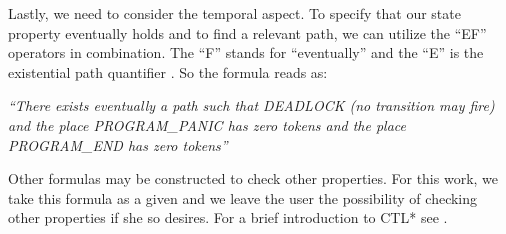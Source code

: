 Lastly, we need to consider the temporal aspect.
To specify that our state property eventually holds and to find a relevant path,
we can utilize the ``EF'' operators in combination.
The ``F'' stands for ``eventually''
and the ``E'' is the existential path quantifier \cite{meyer2020}.
So the formula reads as:

\emph{``There exists eventually a path such that DEADLOCK (no transition may fire)
  and the place PROGRAM\_PANIC has zero tokens and the place PROGRAM\_END has zero tokens''}

Other formulas may be constructed to check other properties.
For this work, we take this formula as a given and
we leave the user the possibility of checking other properties if she so desires.
For a brief introduction to \acrshort{CTL*} see \cite{meyer2020}.